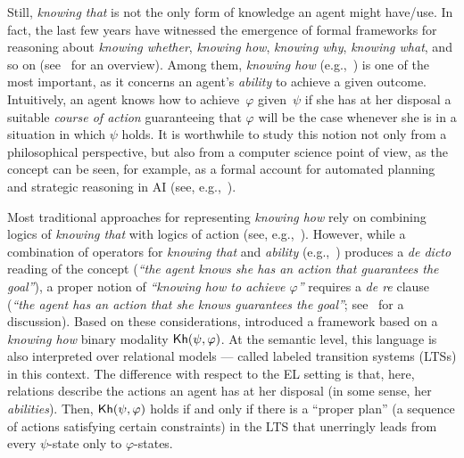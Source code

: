 Still, \emph{knowing that} is not the only form of knowledge an agent might have/use. In fact, the last few years have witnessed the emergence of formal frameworks for reasoning about \emph{knowing whether}, \emph{knowing how}, \emph{knowing why}, \emph{knowing what}, and so on (see~\cite{Wang16} for an overview). Among them, \emph{knowing how} (e.g.,~\cite{Pavese22}) is one of the most important, as it concerns an agent's \emph{ability} to achieve a given outcome. Intuitively, an agent knows how to achieve~$\varphi$ given~$\psi$ if she has at her disposal a suitable \emph{course of action} guaranteeing that $\varphi$ will be the case whenever she is in a situation in which $\psi$ holds. It is worthwhile to study  this notion not only from a philosophical perspective, but also from a computer science point of view, as the concept can be seen, for example, as a formal account for automated planning and strategic reasoning in AI (see, e.g.,~\cite{KandA15}).

Most traditional approaches for representing \emph{knowing how} rely on combining logics of \emph{knowing that} with logics of action (see, e.g.,~\cite{Mccarthy69,Les00,HerzigT06}). However, while a combination of operators for \emph{knowing that} and \emph{ability} (e.g.,~\cite{wiebeetal:2003}) produces a \emph{de dicto} reading of the concept (\emph{``the agent knows she has an action that guarantees the goal''}), a proper notion of \emph{``knowing how to achieve $\varphi$''} requires a \emph{de re} clause (\emph{``the agent has an action that she knows guarantees the goal''}; see~\cite{JamrogaA07,Herzig15} for a discussion). Based on these considerations, \cite{Wang15lori,Wang2016} introduced a framework based on a \emph{knowing how} binary modality ${\sf Kh}(\psi,\varphi)$. At the semantic level, this language is also interpreted over relational models --- called labeled transition systems (LTSs) in this context. The difference with respect to the EL setting is that, here, relations describe the actions an agent has at her disposal (in some sense, her \emph{abilities}).
Then, ${\sf Kh}(\psi,\varphi)$ holds if and only if there is a ``proper plan'' (a sequence of actions satisfying certain constraints) in the LTS that unerringly leads from every $\psi$-state only to $\varphi$-states.


